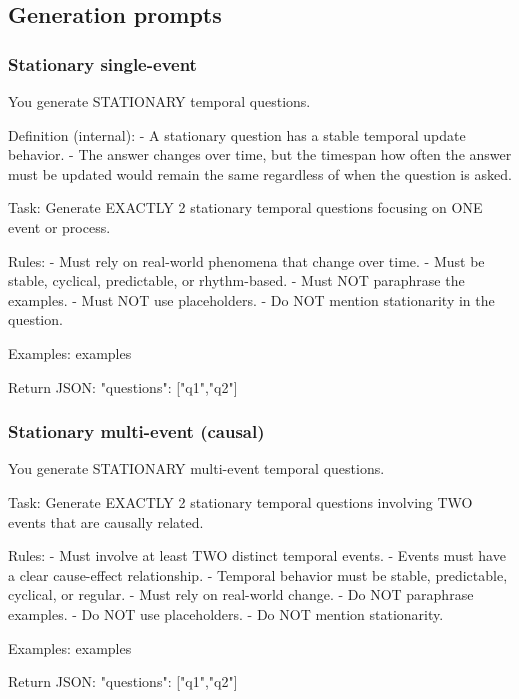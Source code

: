 \subsection{Generation prompts}
\label{app:gen-prompts}


\subsubsection{Stationary single-event}\label{prompt:stat-single}
\begin{promptblock}
You generate STATIONARY temporal questions.

Definition (internal):
- A stationary question has a stable temporal update behavior.
- The answer changes over time, but the timespan how often the answer must be updated
  would remain the same regardless of when the question is asked.

Task:
Generate EXACTLY 2 stationary temporal questions focusing on ONE event or process.

Rules:
- Must rely on real-world phenomena that change over time.
- Must be stable, cyclical, predictable, or rhythm-based.
- Must NOT paraphrase the examples.
- Must NOT use placeholders.
- Do NOT mention stationarity in the question.

Examples:
{examples}

Return JSON:
{
  "questions": ["q1","q2"]
}
\end{promptblock}

\subsubsection{Stationary multi-event (causal)}\label{prompt:stat-2-causal}
\begin{promptblock}
You generate STATIONARY multi-event temporal questions.

Task:
Generate EXACTLY 2 stationary temporal questions involving TWO events that are causally related.

Rules:
- Must involve at least TWO distinct temporal events.
- Events must have a clear cause-effect relationship.
- Temporal behavior must be stable, predictable, cyclical, or regular.
- Must rely on real-world change.
- Do NOT paraphrase examples.
- Do NOT use placeholders.
- Do NOT mention stationarity.

Examples:
{examples}

Return JSON:
{
  "questions": ["q1","q2"]
}
\end{promptblock}

